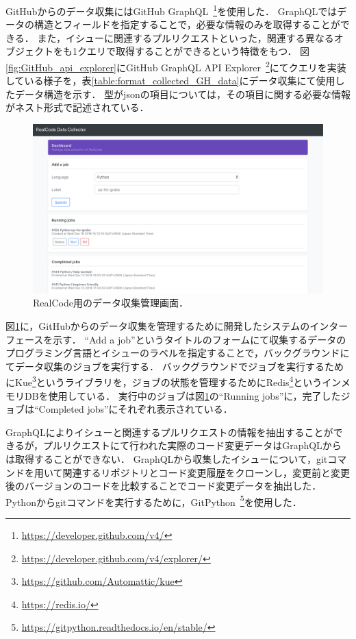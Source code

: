 GitHubからのデータ収集にはGitHub GraphQL~\footnote{\url{https://developer.github.com/v4/}}を使用した．
GraphQLではデータの構造とフィールドを指定することで，必要な情報のみを取得することができる．
また，イシューに関連するプルリクエストといった，関連する異なるオブジェクトをも1クエリで取得することができるという特徴をもつ．
図\ref{fig:GitHub_api_explorer}にGitHub GraphQL API Explorer~\footnote{\url{https://developer.github.com/v4/explorer/}}にてクエリを実装している様子を，表\ref{table:format_collected_GH_data}にデータ収集にて使用したデータ構造を示す．
型がjsonの項目については，その項目に関する必要な情報がネスト形式で記述されている．

\begin{figure}[t]
  \centering
  \includegraphics[width=1.0\columnwidth]{realcode-data-collector-screenshot.png}
  \caption{RealCode用のデータ収集管理画面．}
  \label{fig:realcode-data-collector}
\end{figure}

図\ref{fig:realcode-data-collector}に，GitHubからのデータ収集を管理するために開発したシステムのインターフェースを示す．
``Add a job''というタイトルのフォームにて収集するデータのプログラミング言語とイシューのラベルを指定することで，バックグラウンドにてデータ収集のジョブを実行する．
バックグラウンドでジョブを実行するためにKue\footnote{\url{https://github.com/Automattic/kue}}というライブラリを，ジョブの状態を管理するためにRedis\footnote{\url{https://redis.io/}}というインメモリDBを使用している．
実行中のジョブは図\ref{fig:realcode-data-collector}の``Running jobs''に，完了したジョブは``Completed jobs''にそれぞれ表示されている．

GraphQLによりイシューと関連するプルリクエストの情報を抽出することができるが，プルリクエストにて行われた実際のコード変更データはGraphQLからは取得することができない．
GraphQLから収集したイシューについて，gitコマンドを用いて関連するリポジトリとコード変更履歴をクローンし，変更前と変更後のバージョンのコードを比較することでコード変更データを抽出した．
Pythonからgitコマンドを実行するために，GitPython~\footnote{\url{https://gitpython.readthedocs.io/en/stable/}}を使用した．

